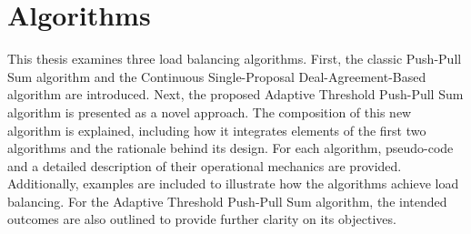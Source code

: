 \chapter{Algorithms}\label{chap:algorithms}
This thesis examines three load balancing algorithms. First, the classic Push-Pull Sum algorithm and the Continuous Single-Proposal Deal-Agreement-Based algorithm are introduced. Next, the proposed Adaptive Threshold Push-Pull Sum algorithm is presented as a novel approach. The composition of this new algorithm is explained, including how it integrates elements of the first two algorithms and the rationale behind its design. For each algorithm, pseudo-code and a detailed description of their operational mechanics are provided. Additionally, examples are included to illustrate how the algorithms achieve load balancing. For the Adaptive Threshold Push-Pull Sum algorithm, the intended outcomes are also outlined to provide further clarity on its objectives.

